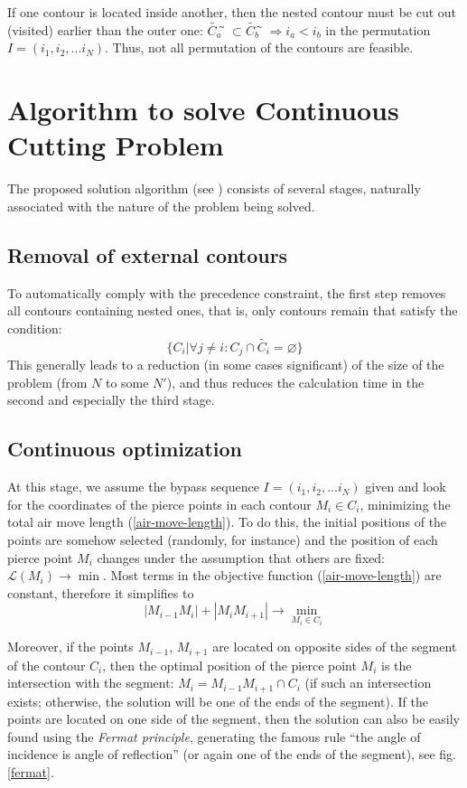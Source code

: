 \documentclass[]{interact}
\theoremstyle{plain}%
\theoremstyle{definition}
\theoremstyle{remark}
\begin{document}
If one contour is located inside another,
then the nested contour must be cut out
(visited)
earlier than the outer one:
$\tilde{C_a} ̃\subset \tilde{C_b} ̃\Rightarrow i_a < i_b$
in the permutation
$I = (i_1, i_2, ... i_N)$.
Thus, not all permutation of the contours are feasible.

\section{Algorithm to solve Continuous Cutting Problem}

The proposed solution algorithm
(see \cite{berlin2019})
consists of several stages,
naturally associated with the nature of the problem being solved.

\subsection{Removal of external contours}

To automatically comply with the precedence constraint,
the first step removes all contours containing nested ones,
that is, only contours remain that satisfy the condition:
$$
\{C_i | \forall j \ne i: C_j \cap \tilde{C_i} = \varnothing \}
$$
This generally leads to a reduction
(in some cases significant)
of the size of the problem
(from $N$ to some $N'$),
and thus reduces the calculation time
in the second and especially the third stage.

\subsection{Continuous optimization}

At this stage,
we assume the bypass sequence
$I = (i_1, i_2, ... i_N)$
given and look for the coordinates of the pierce points
in each contour
$M_i \in C_i$,
minimizing the total air move length (\ref{air-move-length}).
To do this, the initial positions of the points are somehow selected
(randomly, for instance)
and the position of each pierce point $M_i$
changes under the assumption that others are fixed:
$\mathcal{L}(M_i) \to \min$.
Most terms in the objective function
(\ref{air-move-length})
are constant, therefore it simplifies to
$$
|M_{i-1}M_i|+|M_iM_{i+1}| \to \min_{M_i \in C_i}
$$

Moreover,
if the points
$M_{i-1}$,
$M_{i + 1}$
are located on opposite sides of the segment of the contour
$C_i$,
then the optimal position of the
pierce point $M_i$ is the intersection with the segment:
$M_i = M_{i-1} M_{i + 1} \cap C_i$
(if such an intersection exists;
otherwise,
the solution will be one of the ends of the segment).
If the points are located on one side of the segment,
then the solution can also be easily found using the
\textit{Fermat principle},
generating the famous rule
``the angle of incidence is angle of reflection''
(or again one of the ends of the segment),
see fig. \ref{fermat}.
\end{document}
